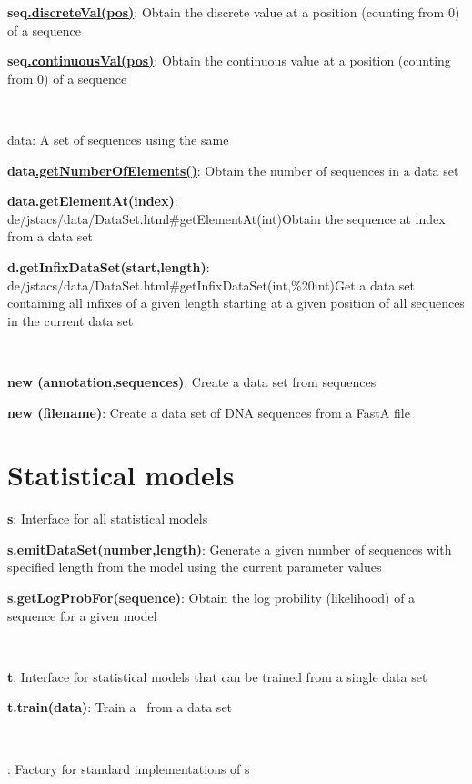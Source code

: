 \documentclass[10pt]{scrartcl}
\newcommand{\entryh}[3]{{\sfb #1#2}: #3}
\newcommand{\entry}[3]{{\bfseries #1#2}: #3}
\newcommand{\entrys}[4]{{\bfseries #1\href{\APIhome/#3}{#2}}: #4}
\begin{document}
\begin{flushleft}
\entrys{seq}{.discreteVal(pos)}{de/jstacs/data/sequences/Sequence.html\#discreteVal(int)}{Obtain the discrete value at a position (counting from 0) of a sequence}

\entrys{seq}{.continuousVal(pos)}{de/jstacs/data/sequences/Sequence.html\#continuousVal(int)}{Obtain the continuous value at a position (counting from 0) of a sequence}

~

\entryh{\DataSet}{ data}{A set of sequences using the same \AlphabetContainer}

\entrys{data}{.getNumberOfElements()}{de/jstacs/data/DataSet.html\#getNumberOfElements()}{Obtain the number of sequences in a data set}

\entry{data}{.getElementAt(index)}{de/jstacs/data/DataSet.html\#getElementAt(int)}{Obtain the sequence at index from a data set}

\entry{d}{.getInfixDataSet(start,length)}{de/jstacs/data/DataSet.html\#getInfixDataSet(int,\%20int)}{Get a data set containing all infixes of a given length starting at a given position of all sequences in the current data set}

~

\entry{new \DataSet}{(annotation,sequences)}{Create a data set from sequences}

\entry{new \DNADataSet}{(filename)}{Create a data set of DNA sequences from a FastA file}

\section{Statistical models}

\entry{\StatMod}{ s}{Interface for all statistical models}

\entry{s}{.emitDataSet(number,length)}{Generate a given number of sequences with specified length from the model using the current parameter values}

\entry{s}{.getLogProbFor(sequence)}{Obtain the log probility (likelihood) of a sequence for a given model}

~

\entry{\TrainSM}{ t}{Interface for statistical models that can be trained from a single data set}

\entry{t}{.train(data)}{Train a \TrainSM~from a data set}

~

%
\entry{\TrainSMFactory}{}{Factory for standard implementations of \TrainSM s}


\end{flushleft}
\end{document}
